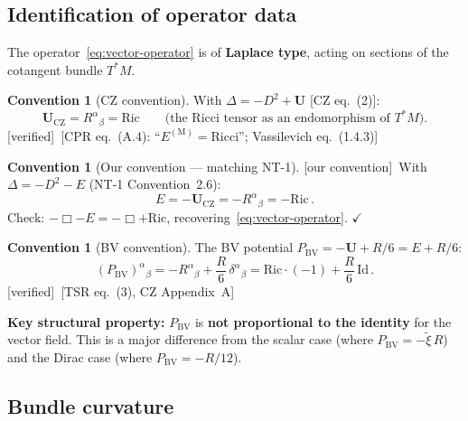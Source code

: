 \documentclass[12pt,a4paper]{article}
\theoremstyle{definition}
\newtheorem{convention}[proposition]{Convention}
\theoremstyle{remark}
\newcommand{\Id}{\mathrm{Id}}
\newcommand{\fromlit}[1]{\textcolor{blue!70!black}{\textsf{[#1]}}}
\newcommand{\oursign}{\textcolor{teal!80!black}{\textsf{[our convention]}}}
\newcommand{\verified}{\textcolor{green!50!black}{\textsf{[verified]}}}
\begin{document}
\subsection{Identification of operator data}
\label{sec:operator-identification}

The operator~\eqref{eq:vector-operator} is of \textbf{Laplace type},
acting on sections of the cotangent bundle $T^*M$.

\begin{convention}[CZ convention]
\label{conv:CZ}
With $\Delta = -D^2 + \mathbf{U}$ \fromlit{CZ eq.~(2)}:
\begin{equation}
  \boxed{
  \mathbf{U}_{\mathrm{CZ}} = R^\alpha{}_\beta
  = \mathrm{Ric}
  \qquad\text{(the Ricci tensor as an endomorphism of $T^*M$).}
  }
  \label{eq:U-CZ-vector}
\end{equation}
\verified\ \fromlit{CPR eq.~(A.4): ``$E^{(\mathrm{M})} = \mathrm{Ricci}$'';
Vassilevich eq.~(1.4.3)}
\end{convention}

\begin{convention}[Our convention --- matching NT-1]
\label{conv:ours}
\oursign\ With $\Delta = -D^2 - E$ (NT-1 Convention~2.6):
\begin{equation}
  \boxed{
  E = -\mathbf{U}_{\mathrm{CZ}} = -R^\alpha{}_\beta
  = -\mathrm{Ric}\,.
  }
  \label{eq:E-vector}
\end{equation}
Check: $-\Box - E = -\Box + \mathrm{Ric}$, recovering~\eqref{eq:vector-operator}.
$\checkmark$
\end{convention}

\begin{convention}[BV convention]
\label{conv:BV}
The BV potential $P_{\mathrm{BV}} = -\mathbf{U} + R/6 = E + R/6$:
\begin{equation}
  \boxed{
  (P_{\mathrm{BV}})^\alpha{}_\beta
  = -R^\alpha{}_\beta + \frac{R}{6}\,\delta^\alpha{}_\beta
  = \mathrm{Ric} \cdot (-1) + \frac{R}{6}\,\Id\,.
  }
  \label{eq:P-BV-vector}
\end{equation}
\verified\ \fromlit{TSR eq.~(3), CZ Appendix~A}

\noindent\textbf{Key structural property:} $P_{\mathrm{BV}}$ is
\textbf{not proportional to the identity} for the vector field.
This is a major difference from the scalar case (where
$P_{\mathrm{BV}} = -\tilde{\xi}\,R$) and the Dirac case
(where $P_{\mathrm{BV}} = -R/12$).
\end{convention}


\subsection{Bundle curvature}
\end{document}
